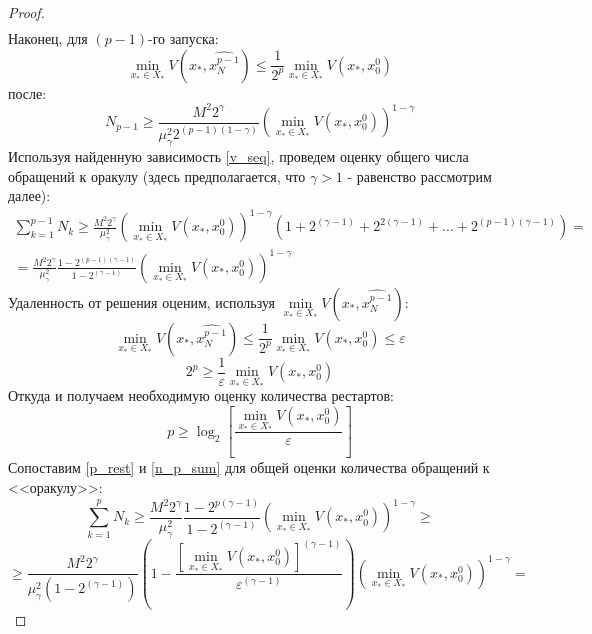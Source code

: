 \begin{proof}
$$\begin{aligned}
       \end{aligned}
       $$
       Наконец, для $(p-1)$-го запуска:
       \begin{equation} \label{v_seq}
           \min\limits_{x_* \in X_*}{V(x_*, \widehat{x_N^{p-1}})} \leq \frac{1}{2^p} \min\limits_{x_* \in X_*}{V(x_*, x_0^0)}
       \end{equation}
       после:
       \begin{equation} \label{n_seq}
           N_{p-1} \geq \frac{M^2 2^{\gamma}}{\mu_{\gamma}^2 2^{(p - 1)(1 - \gamma)}} \left(\min\limits_{x_* \in X_*}{V(x_*, x_0^0)}\right)^{1 - \gamma}
       \end{equation}
       Используя найденную зависимость \eqref{v_seq}, проведем оценку общего числа обращений к оракулу (здесь предполагается, что $\gamma > 1$ - равенство рассмотрим далее):
       \begin{equation} \label{n_p_sum}
       \begin{aligned}
           \sum_{k=1}^{p - 1} N_k \geq \frac{M^2 2^{\gamma}}{\mu_{\gamma}^2} \left(\min\limits_{x_* \in X_*}{V(x_*, x_0^0)}\right)^{1 - \gamma} (1 + 2^{(\gamma-1)} + 2^{2(\gamma - 1)} + ... + 2^{(p-1)(\gamma - 1)}) = \\
           = \frac{M^2 2^{\gamma}}{\mu_{\gamma}^2} \frac{1 - 2^{(p-1)(\gamma-1)}}{1 - 2^{(\gamma-1)}} \left(\min\limits_{x_* \in X_*}{V(x_*, x_0^0)}\right)^{1 - \gamma}
       \end{aligned}
       \end{equation}
       Удаленность от решения оценим, используя $\min\limits_{x_* \in X_*}{V(x_*, \widehat{x_N^{p-1}})}$:
       $$
           \min\limits_{x_* \in X_*}{V(x_*, \widehat{x_N^{p-1}})} \leq \frac{1}{2^p} \min\limits_{x_* \in X_*}{V(x_*, x_0^0)} \leq \varepsilon
       $$
       $$
            2^p \geq \frac{1}{\varepsilon} \min\limits_{x_* \in X_*}{V(x_*, x_0^0)}
       $$
       Откуда и получаем необходимую оценку количества рестартов:
       \begin{equation} \label{p_rest}
            p \geq \log_2{\left[\frac{\min\limits_{x_* \in X_*}{V(x_*, x_0^0)}}{\varepsilon}\right]}
       \end{equation}
       Сопоставим \eqref{p_rest} и \eqref{n_p_sum} для общей оценки количества обращений к <<оракулу>>:
       $$
           \sum_{k=1}^{p} N_k \geq \frac{M^2 2^{\gamma}}{\mu_{\gamma}^2} \frac{1 - 2^{p(\gamma-1)}}{1 - 2^{(\gamma-1)}} \left(\min\limits_{x_* \in X_*}{V(x_*, x_0^0)}\right)^{1 - \gamma} \geq 
       $$
       $$
           \geq \frac{M^2 2^{\gamma}}{\mu_{\gamma}^2 (1 - 2^{(\gamma-1)})} \left(1 - \frac{\left[\min\limits_{x_* \in X_*}{V(x_*, x_0^0)}\right]^{(\gamma-1)}}{\varepsilon^{(\gamma-1)}}\right) \left(\min\limits_{x_* \in X_*}{V(x_*, x_0^0)}\right)^{1 - \gamma} =
$$
\end{proof}
